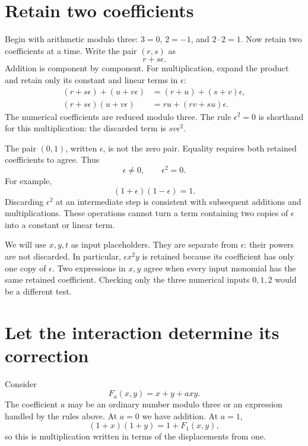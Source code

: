 \section{Retain two coefficients}\label{sec:parameter}

Begin with arithmetic modulo three: \(3=0\), \(2=-1\), and \(2\cdot2=1\). Now retain two coefficients at a time. Write the pair \((r,s)\) as
\[
 r+s\epsilon.
\]
Addition is component by component. For multiplication, expand the product and retain only its constant and linear terms in \(\epsilon\):
\begin{align}
 (r+s\epsilon)+(u+v\epsilon)&=(r+u)+(s+v)\epsilon,\\
 (r+s\epsilon)(u+v\epsilon)&=ru+(rv+su)\epsilon.
 \label{eq:two-coefficients}
\end{align}
The numerical coefficients are reduced modulo three. The rule \(\epsilon^2=0\) is shorthand for this multiplication: the discarded term is \(sv\epsilon^2\).

The pair \((0,1)\), written \(\epsilon\), is not the zero pair. Equality requires both retained coefficients to agree. Thus
\[
 \epsilon\ne0,\qquad \epsilon^2=0.
\]
For example,
\[
 (1+\epsilon)(1-\epsilon)=1.
\]
Discarding \(\epsilon^2\) at an intermediate step is consistent with subsequent additions and multiplications. These operations cannot turn a term containing two copies of \(\epsilon\) into a constant or linear term.

We will use \(x,y,t\) as input placeholders. They are separate from \(\epsilon\): their powers are not discarded. In particular, \(\epsilon x^2y\) is retained because its coefficient has only one copy of \(\epsilon\). Two expressions in \(x,y\) agree when every input monomial has the same retained coefficient. Checking only the three numerical inputs \(0,1,2\) would be a different test.

\section{Let the interaction determine its correction}\label{sec:repair}

Consider
\begin{equation}\label{eq:family}
 F_a(x,y)=x+y+a xy.
\end{equation}
The coefficient \(a\) may be an ordinary number modulo three or an expression handled by the rules above. At \(a=0\) we have addition. At \(a=1\),
\[
 (1+x)(1+y)=1+F_1(x,y),
\]
so this is multiplication written in terms of the displacements from one.

